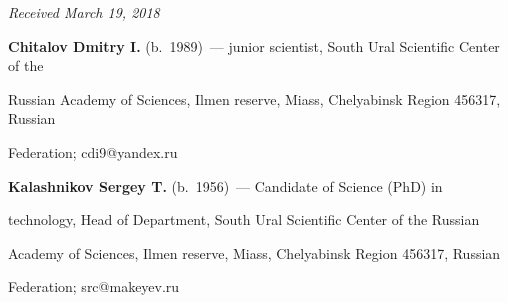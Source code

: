 \vspace*{-3pt}





\hfill{\small\textit{Received March 19, 2018}} 





\Contr





\noindent


\textbf{Chitalov Dmitry I.} (b.\ 1989)~--- junior scientist, South Ural Scientific Center of the 


Russian Academy of Sciences, Ilmen reserve, Miass, Chelyabinsk Region  456317, Russian 


Federation; \mbox{cdi9@yandex.ru} 





\vspace*{3pt}





\noindent


\textbf{Kalashnikov Sergey T.} (b.\ 1956)~--- Candidate of Science (PhD) in 


technology, Head of Department, South Ural Scientific Center of the Russian 


Academy of Sciences, Ilmen reserve, Miass, Chelyabinsk Region  456317, Russian 


Federation; \mbox{src@makeyev.ru}


  


\label{end\stat}








\renewcommand{\bibname}{\protect\rm Литература}


